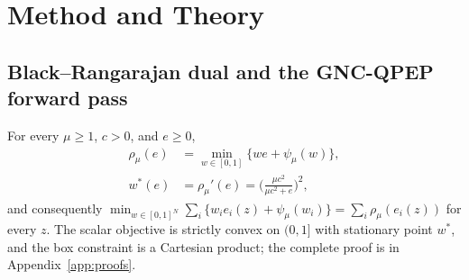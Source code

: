 \section{Method and Theory}
\label{sec:method}

\subsection{Black--Rangarajan dual and the GNC-QPEP forward pass}

\begin{lemma}\label{lem:brdual}
For every $\mu\ge1$, $c>0$, and $e\ge0$,
\begin{equation}
\begin{aligned}
\rho_\mu(e)&=\min_{w\in[0,1]}\big\{we+\psi_\mu(w)\big\},\\
w^*(e)&=\rho_\mu'(e)=\Big(\frac{\mu c^2}{\mu c^2+e}\Big)^2,
\end{aligned}
\end{equation}
and consequently
$\min_{w\in[0,1]^N}\sum_i\{w_ie_i(z)+\psi_\mu(w_i)\}=\sum_i\rho_\mu(e_i(z))$ for every $z$.
The scalar objective is strictly convex on $(0,1]$ with stationary point $w^*$, and the box
constraint is a Cartesian product; the complete proof is in Appendix~\ref{app:proofs}.
\end{lemma}

